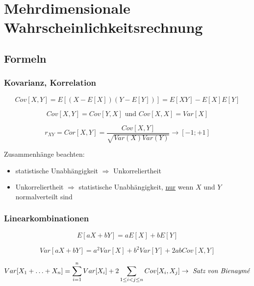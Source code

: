 \section{Mehrdimensionale Wahrscheinlichkeitsrechnung}

\subsection{Formeln}

\subsubsection{Kovarianz, Korrelation}
\begin{equation*}
    Cov[X,Y]=E[(X-E[X])(Y-E[Y])]=E[XY]-E[X]E[Y]
\end{equation*}

\begin{equation*}
    Cov[X,Y]=Cov[Y,X] \text{ und } Cov[X,X]=Var[X]
\end{equation*}

\begin{equation*}
    r_{XY} = Cor[X,Y]=\frac{Cov[X,Y]}{\sqrt{Var(X)Var(Y)}} \rightarrow [-1;+1]
\end{equation*}

Zusammenhänge beachten: 
\begin{itemize}
    \item statistische Unabhängigkeit \(\Rightarrow\) Unkorreliertheit
    \item Unkorreliertheit \(\Rightarrow\) statistische Unabhängigkeit, \underline{nur} wenn \(X\) und \(Y\) normalverteilt sind
\end{itemize}

\subsubsection{Linearkombinationen}
\begin{equation*}
    E[aX+bY]=aE[X]+bE[Y]
\end{equation*}

\begin{equation*}
    Var[aX+bY]=a^2Var[X]+b^2Var[Y]+2abCov[X,Y]
\end{equation*}

\begin{equation*}
    Var[X_1 + \hdots + X_n]=\sum_{i=1}^{n}Var[X_i] + 2\sum_{1\leq i<j\leq n}Cov[X_i,X_j] \rightarrow\text{ \emph{Satz von Bienaymé}}
\end{equation*}


